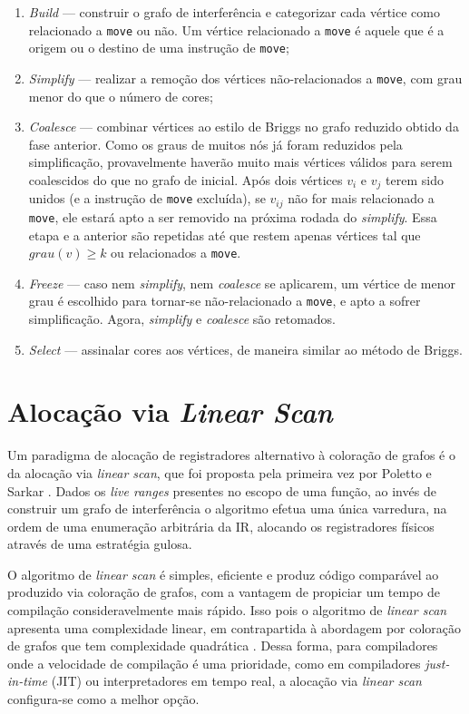 \documentclass[
	12pt,				%
	openright,			%
	oneside,			%
	a4paper,			%
	tccpreliminar,			%
	]{ABNT-DC-UEL}
\begin{document}
\begin{enumerate}
    \item \textit{Build} --- construir o grafo de interferência e categorizar cada vértice como relacionado a \texttt{move} ou não. Um vértice relacionado a \texttt{move} é aquele que é a origem ou o destino de uma instrução de \texttt{move};
    \item \textit{Simplify} --- realizar a remoção dos vértices não-relacionados a \texttt{move}, com grau menor do que o número de cores;
    \item \textit{Coalesce} --- combinar vértices ao estilo de Briggs no grafo reduzido obtido da fase anterior. Como os graus de muitos nós já foram reduzidos pela simplificação, provavelmente haverão muito mais vértices válidos para serem coalescidos do que no grafo de inicial. Após dois vértices $v_i$ e $v_j$ terem sido unidos (e a instrução de \texttt{move} excluída), se $v_{ij}$ não for mais relacionado a \texttt{move}, ele estará apto a ser removido na próxima rodada do \textit{simplify}. Essa etapa e a anterior são repetidas até que restem apenas vértices tal que $grau(v)\geq k$ ou relacionados a \texttt{move}.
    \item \textit{Freeze} --- caso nem \textit{simplify}, nem \textit{coalesce} se aplicarem, um vértice de menor grau é escolhido para tornar-se não-relacionado a \texttt{move}, e apto a sofrer simplificação. Agora, \textit{simplify} e \textit{coalesce} são retomados.
    \item \textit{Select} --- assinalar cores aos vértices, de maneira similar ao método de Briggs.
\end{enumerate}

\section{Alocação via \textit{Linear Scan}}

Um paradigma de alocação de registradores alternativo à coloração de grafos é o da alocação via \textit{linear scan}, que foi proposta pela primeira vez por Poletto e Sarkar \cite{poletto:99}. Dados os \textit{live ranges} presentes no escopo de uma função, ao invés de construir um grafo de interferência o algoritmo efetua uma única varredura, na ordem de uma enumeração arbitrária da IR, alocando os registradores físicos através de uma estratégia gulosa. 

O algoritmo de \textit{linear scan} é simples, eficiente e produz código comparável ao produzido via coloração de grafos, com a vantagem de propiciar um tempo de compilação consideravelmente mais rápido. Isso pois o algoritmo de \textit{linear scan} apresenta uma complexidade linear, em contrapartida à abordagem por coloração de grafos que tem complexidade quadrática \cite{johansson:01}. Dessa forma, para compiladores onde a velocidade de compilação é uma prioridade, como em compiladores \textit{just-in-time} (JIT) ou interpretadores em tempo real, a alocação via \textit{linear scan} configura-se como a melhor opção.
\end{document}
